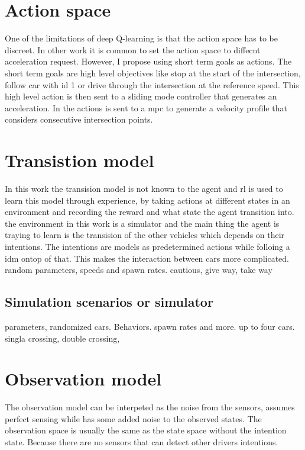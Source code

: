 \section{Action space}
One of the limitations of deep Q-learning is that the action space has to be discreet. In other work it is common to set the action space to diffecnt acceleration request. However, I propose using short term goals as actions. The short term goals are high level objectives like stop at the start of the intersection, follow car with id 1 or drive through the intersection at the reference speed. 
This high level action is then sent to a sliding mode controller that generates an acceleration. 
In \paperMPC the actions is sent to a \gls{mpc} to generate a velocity profile that considers consecutive intersection points.  

\section{Transistion model}
In this work the transision model is not known to the agent and \gls{rl} is used to learn this model through experience, by taking actions at different states in an environment and recording the reward and what state the agent transition into.
the environment in this work is a simulator and the main thing the agent is traying to learn is the transision of the other vehicles which depends on their intentions. 
The intentions are models as predetermined actions while folloing a \gls{idm} ontop of that. This makes the interaction between cars more complicated. 
\paperLSTM random parameters, speeds and spawn rates. 
\paperMPC cautious, give way, take way


\subsection{Simulation scenarios or simulator}
parameters, randomized cars. Behaviors. spawn rates and more. up to four cars. 
singla crossing, double crossing, 

\section{Observation model}
The observation model can be interpeted as the noise from the sensors, \paperLSTM assumes perfect sensing while \paperBelief has some added noise to the observed states. 
The observation space is usually the same as the state space without the intention state. Because there are no sensors that can detect other drivers intentions. 

